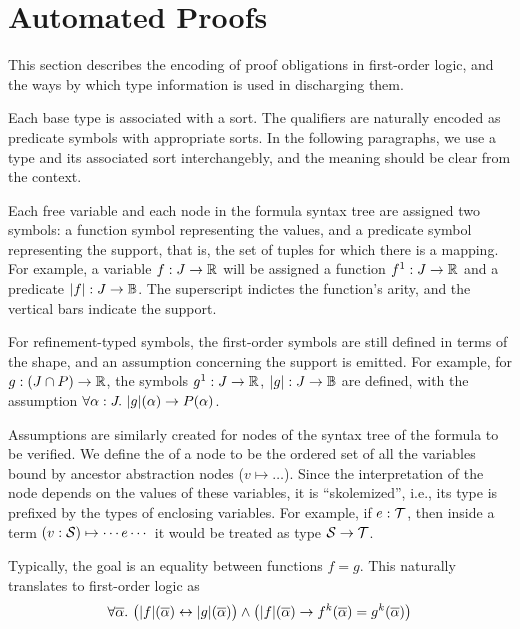 \section{Automated Proofs}

This section describes the encoding of proof obligations in first-order logic,
and the ways by which type information is used in discharging them.

Each base type is associated with a sort. The qualifiers are naturally encoded
as predicate symbols with appropriate sorts. In the following paragraphs, we
use a type and its associated sort interchangebly, and the meaning should be clear
from the context.

Each free variable and each node in the formula syntax tree are assigned two
symbols: a function symbol representing the values, and a predicate symbol
representing the support, that is, the set of tuples for which there is a mapping.
For example, a variable $f : J\to\R$ will be assigned a function $f^1: J\to\R$
and a predicate $|f|: J\to\B$. The superscript indictes the function's arity,
and the vertical bars indicate the support.

For refinement-typed symbols, the first-order symbols are still defined in terms
of the shape, and an assumption concerning the support is emitted. For example,
for $g: (J\cap P)\to\R$, the symbols $g^1:J\to\R$, $|g|:J\to\B$ are defined,
with the assumption $\forall \alpha:J.~|g|(\alpha)\limplies P(\alpha)$.

Assumptions are similarly created for nodes of the syntax tree of the formula to
be verified. We define the  of a node to be the ordered set of
all the variables bound by ancestor abstraction nodes ($v\mapsto\ldots$). Since
the interpretation of the node depends on the values of these variables, it is
``skolemized'', i.e., its type is prefixed by the types of enclosing variables.
For example, if $e:\T$, then inside a term $(v:\S)\mapsto \cdots e\cdots$ it would be treated as
type $\S\to\T$.

Typically, the goal is an equality between functions $f=g$. This naturally translates
to first-order logic as
\[\forall\overline{\alpha}.~\big(|f|(\overline\alpha)\liff|g|(\overline\alpha)\big) \land
  \big(|f|(\overline\alpha) \limplies f^k(\overline\alpha)=g^k(\overline\alpha)\big)\]

